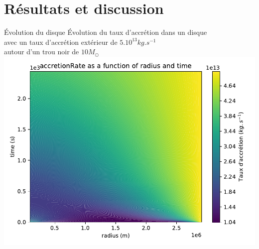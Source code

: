 \documentclass{beamer}
\begin{document}
\section{Résultats et discussion}
\begin{frame}{Évolution du disque}
	\centering
	Évolution du taux d'accrétion dans un disque \\avec un taux d'accrétion extérieur de $5.10^{13} kg.s^{-1}$ \\autour d'un trou noir de $10 M_{\odot}$\\
	\includegraphics[width = 0.7\linewidth]{accretionRate10M}
\end{frame}
\end{document}
